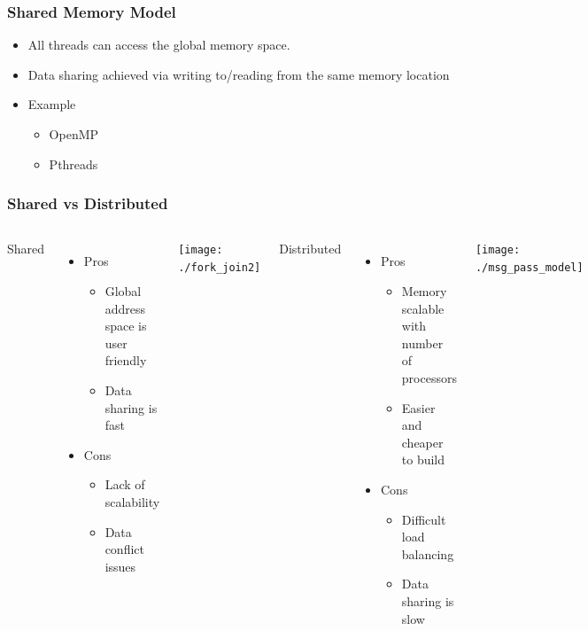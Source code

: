 \documentclass[10pt,t]{beamer}
\begin{document}
\begin{frame}
  \frametitle{Shared Memory Model}
  \begin{itemize}
  \item All threads can access the global memory space.
  \item Data sharing achieved via writing to/reading from the same memory location
  \item Example
    \begin{itemize}
    \item OpenMP
    \item Pthreads
    \end{itemize}
  \end{itemize}
  
\end{frame}

\begin{frame}
  \frametitle{Shared vs Distributed}
  \begin{columns}
    \column{5cm}
    \vspace{-1cm}
    \begin{description}
    \item {Shared}
    \end{description}
    \begin{itemize}
    \item Pros
      \begin{itemize}
      \item Global address space is user friendly
      \item Data sharing is fast
      \end{itemize}
    \item Cons
      \begin{itemize}
      \item Lack of scalability
      \item Data conflict issues
      \end{itemize}
    \end{itemize}
    \texttt{[image: ./fork\_join2]}
    \column{5cm}
    \vspace{-1cm}
    \begin{description}
    \item {Distributed}
    \end{description}
    \begin{itemize}
    \item Pros
      \begin{itemize}
      \item Memory scalable with number of processors
      \item Easier and cheaper to build
      \end{itemize}
    \item Cons
      \begin{itemize}
      \item Difficult load balancing
      \item Data sharing is slow
      \end{itemize}
    \end{itemize}
    \texttt{[image: ./msg\_pass\_model]}
  \end{columns}
\end{frame}
\end{document}
